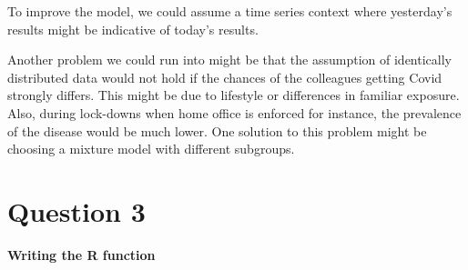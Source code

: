 \documentclass{article}
\begin{document}
To improve the model, we could assume a time series context where yesterday's results might be indicative of today's results. \par 
Another problem we could run into might be that the assumption of identically distributed data would not hold if the chances of the colleagues getting Covid strongly differs. This might be due to lifestyle or differences in familiar exposure. Also, during lock-downs when home office is enforced for instance, the prevalence of the disease would be much lower. One solution to this problem might be choosing a mixture model with different subgroups. 


\section*{Question 3}
\vspace{2em}

\begin{center}
\textbf{Writing the R function} 
\end{center}
\vspace{2em}

\begin{Shaded}
\begin{Highlighting}[]
\SpecialCharTok{::}\SpecialCharTok{$}\NormalTok{(}\NormalTok{, }\NormalTok{, }\NormalTok{,}\NormalTok{, }\NormalTok{, }\NormalTok{)}

\NormalTok{(}\NormalTok{)}

\OtherTok{\textless{}{-}} 
\OtherTok{\textless{}{-}} \NormalTok{(}\SpecialCharTok{*} \NormalTok{, } 
\OtherTok{\textless{}{-}}  \NormalTok{, }
\OtherTok{\textless{}{-}}\SpecialCharTok{+}\SpecialCharTok{\%*\%}\SpecialCharTok{+}
  \NormalTok{(}\NormalTok{(}
\NormalTok{\}}
\end{Highlighting}
\end{Shaded}
\end{document}
